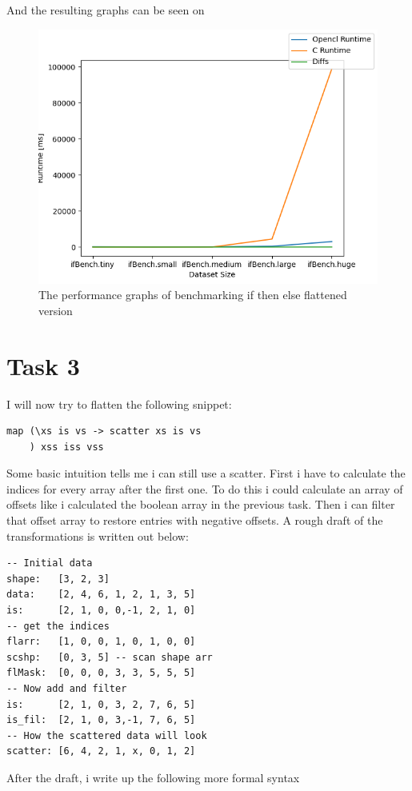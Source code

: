 \documentclass[11pt]{article}
\begin{document}
And the resulting graphs can be seen on

\begin{figure}[htbp]
\centering
\includegraphics[width=.9\linewidth]{./src/task2.png}
\caption{The performance graphs of benchmarking if then else flattened version}
\end{figure}


\section{Task 3}
\label{sec:orgb2f5188}
I will now try to flatten the following snippet:
\begin{verbatim}
map (\xs is vs -> scatter xs is vs
    ) xss iss vss
\end{verbatim}

Some basic intuition tells me i can still use a scatter. First i have to calculate the indices for
every array after the first one. To do this i could calculate an array of offsets like i calculated
the boolean array in the previous task. Then i can filter that offset array to restore entries with
negative offsets. A rough draft of the transformations is written out below:
\begin{verbatim}
-- Initial data
shape:   [3, 2, 3]
data:    [2, 4, 6, 1, 2, 1, 3, 5]
is:      [2, 1, 0, 0,-1, 2, 1, 0]
-- get the indices
flarr:   [1, 0, 0, 1, 0, 1, 0, 0]
scshp:   [0, 3, 5] -- scan shape arr
flMask:  [0, 0, 0, 3, 3, 5, 5, 5]
-- Now add and filter
is:      [2, 1, 0, 3, 2, 7, 6, 5]
is_fil:  [2, 1, 0, 3,-1, 7, 6, 5]
-- How the scattered data will look
scatter: [6, 4, 2, 1, x, 0, 1, 2]
\end{verbatim}
After the draft, i write up the following more formal syntax
\end{document}
